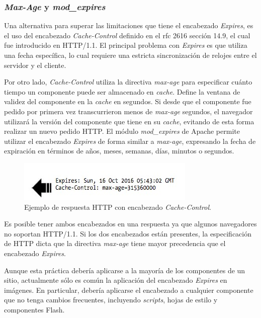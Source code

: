 \subsubsection{\emph{Max-Age} y \emph{mod\_expires}}

Una alternativa para superar las limitaciones que tiene el encabezado \emph{Expires}, es el uso del encabezado \emph{Cache-Control} definido en el rfc 2616 \cite{rfc2616} sección 14.9, el cual
fue introducido en HTTP/1.1. El principal problema con \emph{Expires} es que utiliza
una fecha específica, lo cual requiere una estricta sincronización de relojes entre el servidor y el cliente.

Por otro lado, \emph{Cache-Control} utiliza la directiva \emph{max-age} para especificar cuánto tiempo un componente puede ser almacenado en \emph{cache}.
Define la ventana de validez del componente en la \emph{cache} en segundos. Si desde que el componente fue pedido por primera vez transcurrieron menos de \emph{max-age}
segundos, el navegador utilizará la versión del componente que tiene en su \emph{cache}, evitando de esta forma realizar un nuevo pedido HTTP.
El módulo \emph{mod\_expires} de Apache permite utilizar el encabezado \emph{Expires} de forma similar a \emph{max-age}, expresando la fecha de expiración en términos de
años, meses, semanas, días, minutos o segundos.

\begin{figure}[h!]
\centering
\includegraphics[scale=0.5]{figuras/hpws/cache-control.jpg}
  \caption{Ejemplo de respuesta HTTP con encabezado \emph{Cache-Control}.}
    \label{fig.cache-control}
\end{figure}

Es posible tener ambos encabezados en una respuesta ya que algunos navegadores no soportan HTTP/1.1. Si los dos encabezados están presentes, la especificación
de HTTP dicta que la directiva \emph{max-age} tiene mayor precedencia que el encabezado \emph{Expires}.

Aunque esta práctica debería aplicarse a la mayoría de los componentes de un sitio, actualmente sólo es
común la aplicación del encabezado \emph{Expires} en imágenes. En particular, debería aplicarse el
encabezado a cualquier componente que no tenga cambios frecuentes, incluyendo \emph{scripts}, hojas de estilo y componentes Flash.

